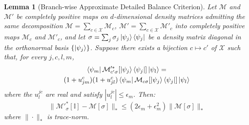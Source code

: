 \documentclass[aps,floatfix,10pt,amssymb,amsfont,amsmath,superscriptaddress,float,nofootinbib,longbibliography,nobalancelastpage,twocolumn]{revtex4-2}
\newtheorem{lemma}{Lemma}
\begin{document}
\begin{lemma}[Branch-wise Approximate Detailed Balance Criterion]
\label{lemma:1}
Let $\mathcal{M}$ and $\mathcal{M'}$ be completely positive maps on $d$-dimensional density matrices admitting the same decomposition $\mathcal{M} = \sum_{c\in\mathcal{X}} \mathcal{M}_c$, $\mathcal{M'} = \sum_{c\in\mathcal{X}} \mathcal{M'}_c$ into completely positive maps $\mathcal{M}_c$ and $\mathcal{M}'_c$, and let $\sigma = \sum_j \sigma_j \ket{\psi_j}\bra{\psi_j}$ be a density matrix diagonal in the orthonormal basis $\{\ket{\psi_j}\}$. Suppose there exists a bijection $c \mapsto c'$ of $\mathcal{X}$ such that, for every $j,c,l,m$,
\begin{multline}
    \bra{\psi_m}\mathcal{M}'^*_{c'\sigma}[\ket{\psi_j}\bra{\psi_j}]\ket{\psi_l}
    =\\(1+u^{c}_{jm})(1+ u^{c}_{jl})
    \bra{\psi_m}\mathcal{M}_{c\sigma}[\ket{\psi_j}\bra{\psi_j}]\ket{\psi_l}
    \label{eq:approximate_quantum_detailed_balance_condition}
\end{multline}
where the $u^{jc}_l$ are real and satisfy $|u^{jc}_l| \leq \epsilon_m$. Then:
 \begin{equation}
    \|\mathcal{M}'^*_{\sigma}[\mathbb{I}]-\mathcal{M}[\sigma] \|_* \leq (2\epsilon_m+\epsilon_m^2)\|\mathcal{M}[\sigma]\|_* \label{eq:lemma2output}
\end{equation}
where $\|\cdot\|_*$ is trace-norm.
\end{lemma}
\end{document}
